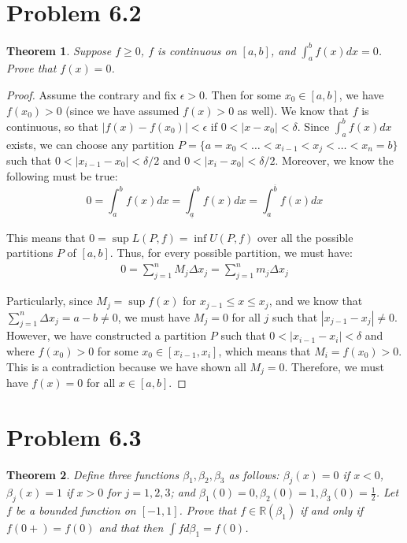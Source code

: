 \documentclass[psamsfonts]{amsart}
\newtheorem{thm}{Theorem}[section]
\theoremstyle{definition}
\theoremstyle{remark}
\numberwithin{equation}{section}
\begin{document}
\section{Problem 6.2}

\begin{thm}
Suppose $f \geq 0$, $f$ is continuous on $[a,b]$, and $\int_{a}^b f(x) dx = 0$. Prove that $f(x) = 0$. 
\end{thm}

\begin{proof}
Assume the contrary and fix $\epsilon > 0$. Then for some $x_0 \in [a,b]$, we have $f(x_0) > 0$ (since we have assumed $f(x) > 0$ as well). We know that $f$ is continuous, so that $|f(x) - f(x_0)| <  \epsilon$ if $0 < |x - x_0| < \delta$. Since $\int_a^b f(x) dx$ exists, we can choose any partition $P = \{ a = x_0 < \ldots < x_{i-1} < x_j < \ldots < x_n = b \}$ such that $0 < |x_{i-1} - x_0 | < \delta/2$ and $0 < |x_i - x_0 |  < \delta/2$. Moreover, we know the following must be true:
\begin{equation}
0 = \int_a^b f(x) dx = \int_{\underline{a}}^b f(x) dx = \int_a^{\overline{b}} f(x) dx
\end{equation}

This means that $0 = \sup L(P,f) = \inf U(P,f)$ over all the possible partitions $P$ of $[a,b]$. Thus, for every possible partition, we must have:
\begin{eqnarray}
0 = \sum_{j=1}^n M_j \Delta x_j = \sum_{j=1}^n m_j \Delta x_j
\end{eqnarray}

Particularly, since $M_j = \sup f(x)$ for $x_{j-1} \leq x \leq x_j$, and we know that $\sum_{j=1}^n \Delta x_j = a - b \neq 0$, we must have $M_j = 0$ for all $j$ such that $|x_{j-1} - x_j| \neq 0$. However, we have constructed a partition $P$ such that $0 < |x_{i-1} - x_i | < \delta$ and where $f(x_0) > 0$ for some $x_0 \in [x_{i-1},x_i]$, which means that $M_i = f(x_0) > 0$. This is a contradiction because we have shown all $M_j = 0$. Therefore, we must have $f(x) = 0$ for all $x \in [a,b]$. 
\end{proof}

\section{Problem 6.3}

\begin{thm}
Define three functions $\beta_1, \beta_2, \beta_3$ as follows: $\beta_j(x) = 0$ if $x < 0$, $\beta_j(x) = 1$ if $x > 0$ for $j = 1,2,3$; and $\beta_1(0) = 0, \beta_2(0) = 1, \beta_3(0) = \frac{1}{2}$. Let $f$ be a bounded function on $[-1,1]$. Prove that $f \in \mathbb{R}(\beta_1)$ if and only if $f(0+) = f(0)$ and that then $\int f d\beta_1 = f(0)$.
\end{thm}
\end{document}
